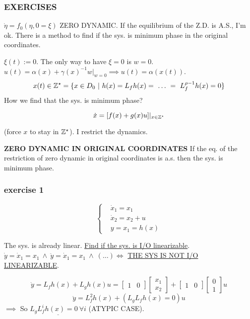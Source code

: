 \subsubsection{EXERCISES}

$\dot{\eta} = f_0(\eta, 0 = \xi)$ ZERO DYNAMIC. If the equilibrium of the Z.D. is A.S., I'm ok. There is a method to find if the sys. is minimum phase in the original coordinates.

$\xi(t) := 0$. The only way to have $\xi=0$ is $w=0$.
$u(t) = \alpha(x) + \gamma(x)^{-1}w|_{w=0} \implies u(t) = \alpha(x(t))$.
\[
	x(t) \in \Z^\star = \{x \in D_0\ |\ h(x)=L_fh(x)=\ \dots\ = \ L^{\rho-1}_fh(x) = 0\}
\]
How we find that the sys. is minimum phase?

\[
	\dot{x} = [f(x) + g(x)u]|_{x\in \mathbb{Z}^\star}
\]

(force $x$ to stay in $\mathbb{Z}^\star$). I restrict the dynamics.

\textbf{ZERO DYNAMIC IN ORIGINAL COORDINATES}
If the eq. of the restriction of zero dynamic in original coordinates is a.s. then the sys. is minimum phase.

\subsubsection{exercise 1}
\[
	\left\{
	\begin{aligned}
	&\dot{x}_1 = x_1 \\
	&\dot{x}_2 = x_2 + u \\
	&y = x_1 = h(x)
	\end{aligned}
	\right.
\]

The sys. is already linear. \underline{Find if the sys. is I/O linearizable}.
$\dot{y} = \dot{x}_1 = x_1\ \land\ \ddot{y} = \dot{x}_1 = x_1\ \land\ (\dots) \iff$ \underline{THE SYS IS NOT I/O LINEARIZABLE}.

\[
	\dot{y} = L_fh(x) + L_gh(x)u = \begin{bmatrix}1&0\end{bmatrix}\begin{bmatrix}x_1\\x_2\end{bmatrix} + \begin{bmatrix}1&0\end{bmatrix}\begin{bmatrix}0\\1\end{bmatrix}u
\]
\[
	\ddot{y} = L^2_fh(x) + (L_gL_fh(x) = 0)u
\]
$\implies$ So $\underline{L_gL_f^ih(x) = 0\ \forall i}$ (ATYPIC CASE).


